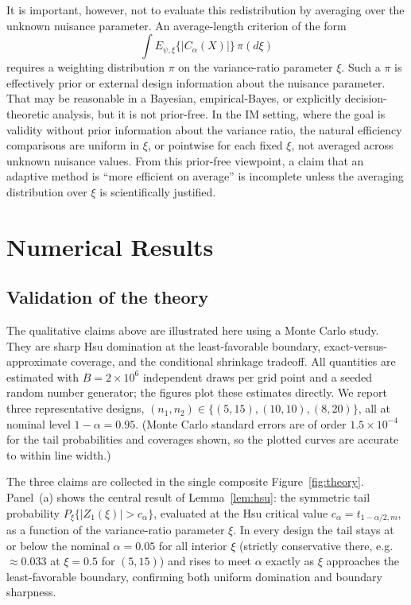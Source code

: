 \documentclass[12pt]{article}
\begin{document}
It is important, however, not to evaluate this redistribution by averaging
over the unknown nuisance parameter.  An average-length criterion of the form
\[
\int E_{\psi,\xi}\{|C_\alpha(X)|\}\,\pi(d\xi)
\]
requires a weighting distribution \(\pi\) on the variance-ratio parameter
\(\xi\).  Such a \(\pi\) is effectively prior or external design information
about the nuisance parameter.  That may be reasonable in a Bayesian,
empirical-Bayes, or explicitly decision-theoretic analysis, but it is not
prior-free.  In the IM setting, where the goal is validity without prior
information about the variance ratio, the natural efficiency comparisons are
uniform in \(\xi\), or pointwise for each fixed \(\xi\), not averaged across
unknown nuisance values.  From this prior-free viewpoint, a claim that an
adaptive method is ``more efficient on average'' is incomplete unless the
averaging distribution over \(\xi\) is scientifically justified.

\section{Numerical Results}
\label{sec:numerics}

\subsection{Validation of the theory}
\label{sec:numerical}

The qualitative claims above are illustrated here using a Monte Carlo study.
They are sharp Hsu domination at the least-favorable boundary,
exact-versus-approximate coverage, and the conditional shrinkage tradeoff.  All quantities are
estimated with \(B=2\times10^{6}\) independent draws per grid point and a
seeded random number generator; the figures plot these estimates directly. We
report three representative designs, \((n_1,n_2)\in\{(5,15),(10,10),(8,20)\}\),
all at nominal level \(1-\alpha=0.95\).  (Monte Carlo standard errors are of
order \(1.5\times10^{-4}\) for the tail probabilities and coverages shown, so
the plotted curves are accurate to within line width.)

The three claims are collected in the single composite
Figure~\ref{fig:theory}.  Panel~(a) shows the central result of
Lemma~\ref{lem:hsu}: the symmetric tail probability
\(P_\xi\{|Z_1(\xi)|>c_\alpha\}\), evaluated at the Hsu critical value
\(c_\alpha=t_{1-\alpha/2,m}\), as a function of the variance-ratio parameter
\(\xi\).  In every design the tail stays at or below the nominal \(\alpha=0.05\)
for all interior \(\xi\) (strictly conservative there, e.g.\ \(\approx0.033\) at
\(\xi=0.5\) for \((5,15)\)) and rises to meet \(\alpha\) exactly as \(\xi\)
approaches the least-favorable boundary, confirming both uniform domination and
boundary sharpness.
\end{document}
